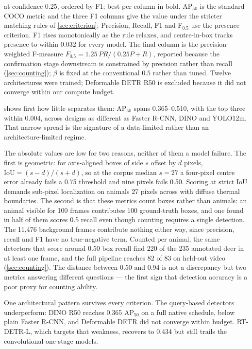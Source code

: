 \begin{table}[t]
{at confidence 0.25, ordered by F1; best per column in bold. AP$_{50}$ is the standard COCO
metric and the three F1 columns give the value under the stricter matching rules of
\cref{sec:criterion}; Precision, Recall, F1 and F$_{0.5}$ use the presence criterion. F1
rises monotonically as the rule relaxes, and centre-in-box tracks presence to within 0.032
for every model. The final column is the precision-weighted F-measure
$F_{0.5}=1.25\,PR/(0.25P+R)$, reported because the confirmation stage downstream is
constrained by precision rather than recall (\cref{sec:counting}); $\beta$ is fixed at the
conventional $0.5$ rather than tuned. Twelve architectures were trained; Deformable DETR R50
is excluded because it did not converge within our compute budget.}
\label{tab:detectors}
\end{table}

 shows first how little separates them: AP$_{50}$ spans 0.365--0.510,
with the top three within 0.004, across designs as different as Faster R-CNN, DINO and
YOLO12m. That narrow spread is the signature of a data-limited rather than an
architecture-limited regime.

The absolute values are low for two reasons, neither of them a model failure. The first is
geometric: for axis-aligned boxes of side $s$ offset by $d$ pixels,
$\mathrm{IoU}=(s-d)/(s+d)$, so at the corpus median $s=27$ a four-pixel centre error already
fails a 0.75 threshold and nine pixels fails 0.50. Scoring at strict IoU demands sub-pixel
localization on animals 27 pixels across with diffuse thermal boundaries. The second is that
these metrics count boxes rather than animals: an animal visible for 100 frames contributes
100 ground-truth boxes, and one found in half of them scores 0.5 recall even though counting
requires a single detection. The 11,476 background frames contribute nothing either way,
since precision, recall and F1 have no true-negative term. Counted per animal, the same
detectors that score around 0.50 box recall find 220 of the 235 annotated deer in at least
one frame, and the full pipeline reaches 82 of 83 on held-out video (\cref{sec:counting}).
The distance between 0.50 and 0.94 is not a discrepancy but two metrics answering different
questions --- the first sign that detection accuracy is a poor proxy for counting ability.

One architectural pattern survives every criterion. The query-based detectors underperform:
DINO R50 reaches 0.365 AP$_{50}$ on a full native schedule, below plain Faster R-CNN, and
Deformable DETR did not converge within budget. RT-DETR-L, which targets that weakness,
recovers to 0.434 but still trails the convolutional one-stage models.

